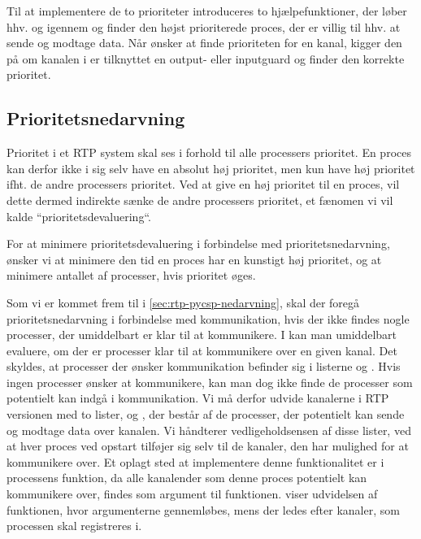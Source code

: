 Til at implementere de to prioriteter introduceres  to hjælpefunktioner, der løber hhv.  og  igennem og  finder den højst prioriterede proces, der er villig til hhv. at sende og modtage data. Når   ønsker at finde prioriteten for en kanal, kigger den på om kanalen i  er tilknyttet en output- eller inputguard og finder den korrekte prioritet.


\subsection{Prioritetsnedarvning}
Prioritet i et RTP system skal ses i forhold til alle processers prioritet. En proces kan derfor ikke i sig selv have en absolut høj prioritet, men kun have høj prioritet ifht. de andre processers prioritet. Ved at give en høj prioritet til  en proces, vil dette dermed  indirekte sænke de andre processers prioritet, et fænomen vi vil kalde ``prioritetsdevaluering``.

For at minimere prioritetsdevaluering i forbindelse med prioritetsnedarvning, ønsker vi at minimere den tid en proces har en kunstigt høj prioritet, og at minimere antallet af processer, hvis prioritet øges. 

Som vi er kommet frem til i \cref{sec:rtp-pycsp-nedarvning}, skal  der foregå  prioritetsnedarvning i forbindelse med kommunikation, hvis der ikke findes nogle processer, der umiddelbart er klar til at kommunikere.  I \pycsp kan man umiddelbart evaluere, om der er processer klar til at kommunikere over en given kanal. Det skyldes, at processer der ønsker kommunikation befinder sig i listerne  og . Hvis ingen processer ønsker at kommunikere, kan man dog ikke finde de processer som potentielt kan indgå i kommunikation.
Vi må derfor udvide kanalerne i RTP versionen med to lister,  og , der består af de processer, der potentielt kan sende og modtage data over kanalen. Vi håndterer vedligeholdsensen af disse lister, ved at hver proces ved opstart tilføjer sig selv til de kanaler, den har mulighed for at kommunikere over. Et oplagt sted at implementere denne funktionalitet er i processens    funktion, da alle kanalender som denne proces potentielt kan kommunikere over, findes som argument til   funktionen.  viser udvidelsen af funktionen, hvor argumenterne gennemløbes, mens der ledes efter kanaler, som processen skal registreres i.

